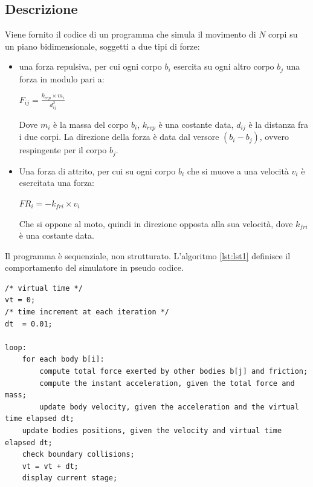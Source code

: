 \documentclass[12pt,a4paper,openright,twoside]{book}
\begin{document}
	
\frontmatter



\tableofcontents   

\mainmatter

\chapter{\introductionname}
\label{chap:introduction}
\section{Descrizione}
Viene fornito il codice di un programma che simula il movimento di $N$ corpi su un piano bidimensionale,
soggetti a due tipi di forze:
\begin{itemize}
	\item una forza repulsiva, per cui ogni corpo $b_{i}$ esercita su ogni altro corpo $b_{j}$ una forza in modulo pari a:
	\begin{center}
		$ F_{ij} = \frac{k_{rep} \times m_{i}}{d^2_{ij}} $
	\end{center}
	Dove $m_{i}$ è la massa del corpo $b_{i}$, $k_{rep}$ è una costante data, $d_{ij}$ è la distanza fra i due corpi.
	La direzione della forza è data dal versore $(b_{i} - b_{j})$, ovvero respingente per il corpo $b_{j}$.
	\item Una forza di attrito, per cui su ogni corpo $b_{i}$ che si muove a una velocità $v_{i}$ è esercitata una forza:
	\begin{center}
		$ FR_{i} = - k_{fri} \times v_{i} $
	\end{center}
	Che si oppone al moto, quindi in direzione opposta alla sua velocità, dove $k_{fri}$ è una costante data.
\end{itemize}
Il programma è sequenziale, non strutturato. 
L'algoritmo \ref{lst:lst1} definisce il comportamento del simulatore in pseudo codice.
\newpage
\begin{lstlisting}[label=lst:lst1,caption=Pseudocodice del programma sequenziale]
/* virtual time */
vt = 0;
/* time increment at each iteration */     
dt  = 0.01;

loop:
	for each body b[i]:
		compute total force exerted by other bodies b[j] and friction;
		compute the instant acceleration, given the total force and mass;
		update body velocity, given the acceleration and the virtual time elapsed dt;
	update bodies positions, given the velocity and virtual time elapsed dt;
	check boundary collisions;
	vt = vt + dt;   
	display current stage;

\end{lstlisting}
\end{document}
